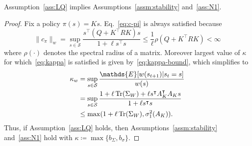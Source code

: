 \documentclass[letterpaper, 10pt]{IEEEtran}
\newcommand*\ALPHABET{\mathcal}
\newcommand*\EXP{\mathds{E}}
\DeclareMathOperator{\Tr}{Tr}
\begin{document}
\begin{lemma}\label{lem:LQ}
    Assumption~\ref{ass:LQ} implies Assumptions~\ref{assm:stability} and~\ref{ass:N1}.
\end{lemma}
\begin{proof}
   Fix a policy $\pi(s) = Ks$. Eq.~\eqref{eq:c-pi} is always satisfied because
   \[
      \| c_{\pi} \|_w = \sup_{s\in \ALPHABET S} \frac{s^\intercal (Q + K^\intercal R K) s}{ 1 + \ell s^\intercal s}
      \le \frac{1}{\ell} \rho(Q + K^\intercal R K) < \infty 
   \]
   where $\rho(\cdot)$ denotes the spectral radius of a matrix.
  \endgraf 
  Moreover largest value of $\kappa$ for which~\eqref{eq:kappa} is satisfied is given by~\eqref{eq:kappa-bound}, which simplifies to
    \begin{align*}
        \kappa_w &= \sup_{s\in \ALPHABET S}\frac{\EXP[w(s_{t+1}) | s_t = s]}{w(s)} \notag \\
        &= \sup_{s\in \ALPHABET S}\frac{1 + \ell \Tr(\Sigma_W) + \ell  s^\intercal A_K^\intercal A_K s}{
         1 + \ell  s^\intercal s
         } 
         \notag\\
         &\leq \max(1 + \ell\Tr(\Sigma_W), \sigma_1^2(A_K)).
    \end{align*}
    Thus, if Assumption~\ref{ass:LQ} holds, then Assumptions~\ref{assm:stability} and~\ref{ass:N1} hold with $\kappa \coloneqq \max\{b_\Sigma, b_\sigma\}$.
\end{proof}
\end{document}

